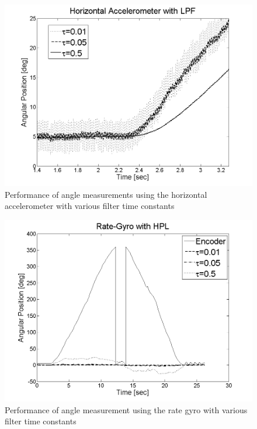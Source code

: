 \documentclass{article}
\theoremstyle{plain}
\theoremstyle{definition}
\theoremstyle{remark}
\begin{document}
\begin{figure}
\begin{center}
\includegraphics[width = 12cm]{Z_Horizontal_LPF_TimeConstant.png}
\caption{Performance of angle measurements using the horizontal accelerometer with various filter time constants}
\end{center}
\end{figure}

\begin{figure}
\begin{center}
\includegraphics[width = 12cm]{Gyro_HPF_TimeConstant.png}
\caption{Performance of angle measurement using the rate gyro with various filter time constants}
\end{center}
\end{figure}

\clearpage

\end{document}
